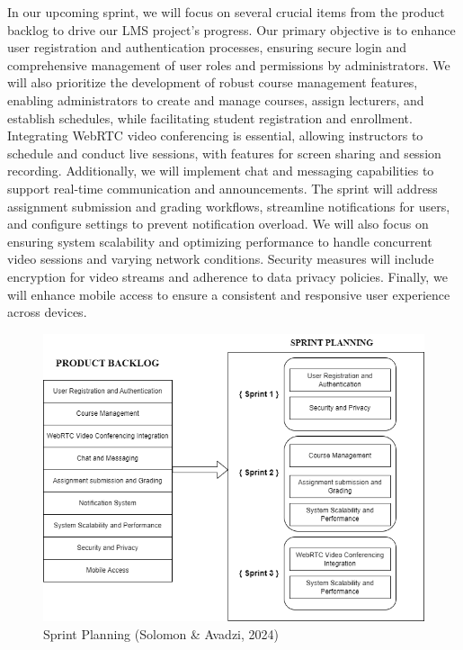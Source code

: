 \documentclass[a4paper,12pt]{article}  %
\begin{document}
In our upcoming sprint, we will focus on several crucial items from the product
backlog to drive our LMS project's progress. Our primary objective is to
enhance user registration and authentication processes, ensuring secure login
and comprehensive management of user roles and permissions by administrators.
We will also prioritize the development of robust course management features,
enabling administrators to create and manage courses, assign lecturers, and
establish schedules, while facilitating student registration and enrollment.
Integrating WebRTC video conferencing is essential, allowing instructors to
schedule and conduct live sessions, with features for screen sharing and
session recording. Additionally, we will implement chat and messaging
capabilities to support real-time communication and announcements. The sprint
will address assignment submission and grading workflows, streamline
notifications for users, and configure settings to prevent notification
overload. We will also focus on ensuring system scalability and optimizing
performance to handle concurrent video sessions and varying network conditions.
Security measures will include encryption for video streams and adherence to
data privacy policies. Finally, we will enhance mobile access to ensure a
consistent and responsive user experience across devices.\\

\begin{figure}[H]
      \centering
      \includegraphics[width=1\textwidth]{figures/sprint-planning.png}
      \caption{Sprint Planning (Solomon \& Avadzi, 2024)}
\end{figure}
\end{document}
